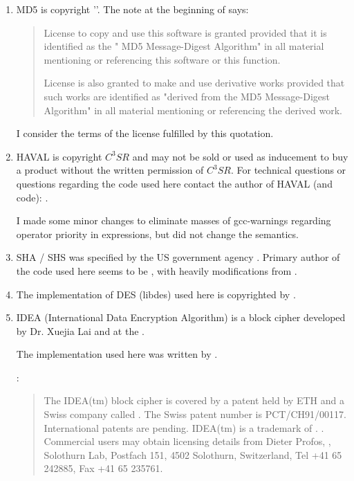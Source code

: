 \documentclass {report}
\begin{document}
\begin {enumerate}
\item	MD5 is copyright '\rsadsi{}'. The note at the
	beginning of  says:

	\begin {quotation}
		License to copy and use this software is granted
		provided that it is identified as the "\rsadsi{} MD5
		Message-Digest Algorithm" in all material mentioning
		or referencing this software or this function.
                                                                  
		License is also granted to make and use derivative
		works provided that such works are identified as
		"derived from the \rsadsi{} MD5 Message-Digest
		Algorithm" in all material mentioning or referencing
		the derived work.
	\end   {quotation}

	I consider the terms of the license fulfilled by this
	quotation. 

\item	HAVAL is copyright $C^3SR$ and may not be sold or used as
	inducement to buy a product without the written permission of
	$C^3SR$. For technical questions or questions regarding the
	code used here contact the author of HAVAL (and code): \yuliang.

	I made some minor changes to eliminate masses of \cmd
	{gcc}-warnings regarding operator priority in expressions, but
	did not change the semantics.


\item	SHA / SHS was specified by the US government agency
	\NIST. Primary author of the code used here seems to be
	\pgutmann, with heavily modifications from \uh. 

\item	The implementation of DES (libdes) used here is copyrighted by
	\eay.

\item	IDEA (International Data Encryption Algorithm) is a block
	cipher developed  by  Dr. Xuejia Lai  and \massey{} at the \sfit{}.

	The implementation used here was written by \demoliner.

	:
	\begin {quotation}
		The IDEA(tm) block cipher is covered by a patent held
		by ETH and a Swiss company called \ascom{}.  The
		Swiss patent number is PCT/CH91/00117.  International
		patents are pending. IDEA(tm) is a trademark of
		\ascom{}.  .  Commercial users may obtain
		licensing details from Dieter Profos, \ascom{},
		Solothurn Lab, Postfach 151, 4502 Solothurn,
		Switzerland, Tel +41 65 242885, Fax +41 65 235761. 
	\end {quotation}


\end{enumerate}
\end{document}
